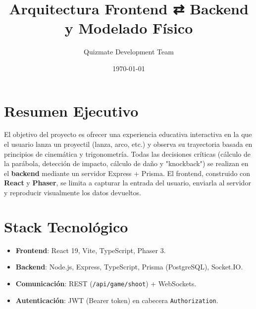 \documentclass[12pt]{article}
\title{Arquitectura Frontend ⇄ Backend y Modelado Físico}
\author{Quizmate Development Team}
\date{\today}
\begin{document}
\maketitle

\section*{Resumen Ejecutivo}
El objetivo del proyecto es ofrecer una experiencia educativa interactiva en la que el usuario lanza un proyectil (lanza, arco, etc.) y observa su trayectoria basada en principios de cinemática y trigonometría.  
Todas las decisiones críticas (cálculo de la parábola, detección de impacto, cálculo de daño y "knockback") se realizan en el \textbf{backend} mediante un servidor Express + Prisma.  
El frontend, construido con \textbf{React} y \textbf{Phaser}, se limita a capturar la entrada del usuario, enviarla al servidor y reproducir visualmente los datos devueltos.

\section*{Stack Tecnológico}
\begin{itemize}
  \item \textbf{Frontend}: React 19, Vite, TypeScript, Phaser 3.
  \item \textbf{Backend}: Node.js, Express, TypeScript, Prisma (PostgreSQL), Socket.IO.
  \item \textbf{Comunicación}: REST (\texttt{/api/game/shoot}) + WebSockets.
  \item \textbf{Autenticación}: JWT (Bearer token) en cabecera \texttt{Authorization}.
\end{itemize}
\end{document}
